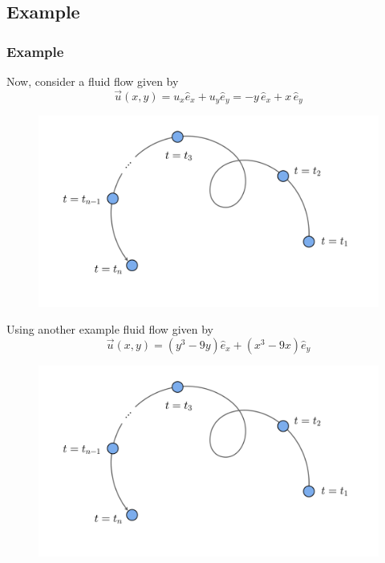 \documentclass[11pt,]{beamer}
\begin{document}
\subsection{Example}
\begin{frame}
	\frametitle{Example}
	Now, consider a fluid flow given by
	\begin{equation}
	\vec{u}(x,y) = u_x\hat{e}_x + u_y \hat{e}_{y} = -y\,\hat{e}_x + x\,\hat{e}_y
	\end{equation}
	
	\begin{figure}
    \includegraphics[page=7, width=0.9\linewidth]{imgs.pdf}
	\end{figure}
\end{frame}
\begin{frame}
	Using another example fluid flow given by
	\begin{equation}
	\vec{u}(x,y) = \left(y^3 - 9y\right) \hat{e}_x + \left(x^3 - 9x\right)\hat{e}_y
	\end{equation}
	
	\begin{figure}
    \includegraphics[page=8, width=0.8\linewidth]{imgs.pdf}
	\end{figure}

\end{frame}
\end{document}
